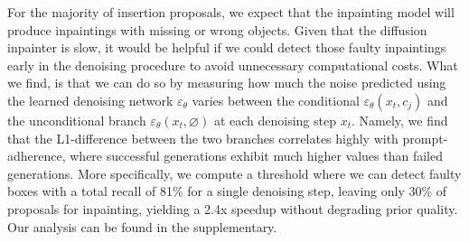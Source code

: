 
\label{sec:speedup_text} For the majority of insertion proposals, we expect that the inpainting model will produce inpaintings with missing or wrong objects. Given that the diffusion inpainter is slow, it would be helpful if we could detect those faulty inpaintings early in the denoising procedure to avoid unnecessary computational costs. What we find, is that we can do so by measuring how much the noise predicted using the learned denoising network $\varepsilon_{\theta}$ varies between the conditional $\varepsilon_{\theta}(x_t, c_j)$ and the unconditional branch $\varepsilon_{\theta}(x_t, \varnothing)$ at each denoising step $x_t$. Namely, we find that the L1-difference between the two branches correlates highly with prompt-adherence, where successful generations exhibit much higher values than failed generations. More specifically, we compute a threshold where we can detect faulty boxes with a total recall of 81\% for a single denoising step, leaving only 30\% of proposals for inpainting, yielding a 2.4x speedup without degrading prior quality. Our analysis can be found in the supplementary.














